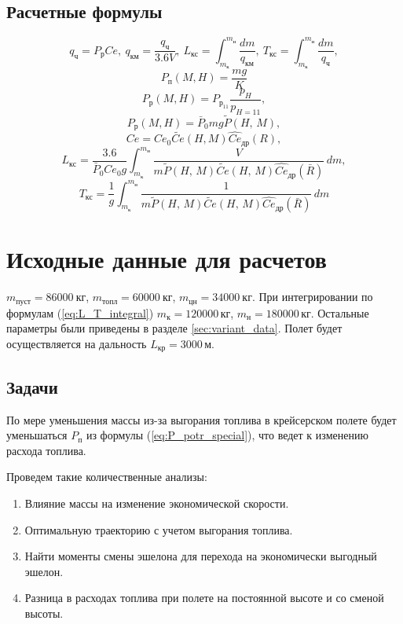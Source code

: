 \subsection{Расчетные формулы} 
\begin{equation}
\label{eq:L_T_integral}
q_{ч}=P_{р} Ce, \: q_{км}=\frac{q_{ч}}{3.6 V}, \: L_{кс}= \int_{m_к}^{m_н} \frac{dm}{q_{км}},\: T_{кс}= \int_{m_к}^{m_н} \frac{dm}{q_{ч}},
\end{equation}
\begin{equation}
    P_п(M, H)= \frac{mg}{K} 
    \label{eq:P_potr_special}
\end{equation}
\begin{equation}
    P_р(M, H)= P_{р_{11}} \frac{p_H}{p_{H=11}},
\end{equation}
\begin{equation}
    P_р(M, H) = \bar{P}_0 m g \tilde{P}(H,\, M),
\end{equation}
\begin{equation}
Ce = Ce_0 \tilde{Ce}(H,M) \hat{Ce}_{др}(R),
\end{equation}
\begin{equation}
    L_{кс}= \frac{3.6}{\bar{P}_0 Ce_0g} \int_{m_к}^{m_н} \frac{V}{m
    \tilde{P}(H,\,M) \tilde{Ce}(H,\, M) \hat{Ce}_{др}(\bar{R})}   \, dm,
\end{equation}
\begin{equation}
    T_{кс}= \frac{1}{g} \int_{m_к}^{m_н} \frac{1}{m \tilde{P}(H,\,M)
\tilde{Ce}(H,\, M) \hat{Ce}_{др}(\bar{R})}\, dm
\end{equation}

\section{Исходные данные для расчетов}

$m_{пуст} = 86000\ \text{кг}$, $m_{топл}= 60000\ \text{кг}$, $m_{цн}=34000\ \text{кг}$.
При интегрировании по формулам (\ref{eq:L_T_integral}) $m_{к}=120000\, кг$, $m_{н}=180000\, кг$.
Остальные параметры были приведены в разделе \ref{sec:variant_data}. Полет
будет осуществляется на дальность $L_{кр} = 3000 \, м$.

\subsection{Задачи}
По мере уменьшения массы из-за выгорания топлива в крейсерском полете будет
уменьшаться $P_п$ из формулы (\ref{eq:P_potr_special}), что ведет к изменению расхода
топлива.  

Проведем такие количественные анализы:  

\begin{enumerate}
    \item Влияние массы на изменение экономической скорости.
    \item Оптимальную траекторию с учетом выгорания топлива.
    \item Найти моменты смены эшелона для перехода на экономически выгодный эшелон. 
    \item Разница в расходах топлива при полете на постоянной высоте и со сменой высоты.
\end{enumerate}
